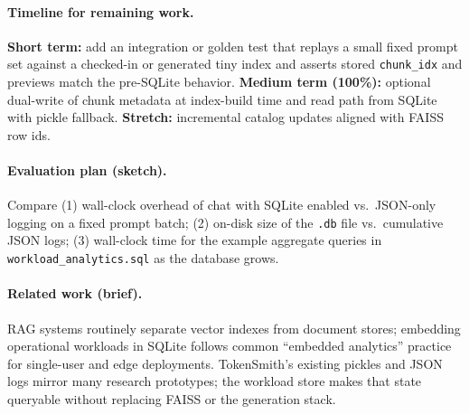 \documentclass[10pt,twocolumn]{article}
\begin{document}
\paragraph{Timeline for remaining work.}
\textbf{Short term:} add an integration or golden test that replays a small fixed prompt set against a checked-in or generated tiny index and asserts stored \texttt{chunk\_idx} and previews match the pre-SQLite behavior. \textbf{Medium term (100\%):} optional dual-write of chunk metadata at index-build time and read path from SQLite with pickle fallback. \textbf{Stretch:} incremental catalog updates aligned with FAISS row ids.

\paragraph{Evaluation plan (sketch).}
Compare (1) wall-clock overhead of chat with SQLite enabled vs.\ JSON-only logging on a fixed prompt batch; (2) on-disk size of the \texttt{.db} file vs.\ cumulative JSON logs; (3) wall-clock time for the example aggregate queries in \texttt{workload\_analytics.sql} as the database grows.

\paragraph{Related work (brief).}
RAG systems routinely separate vector indexes from document stores; embedding operational workloads in SQLite follows common ``embedded analytics'' practice for single-user and edge deployments. TokenSmith's existing pickles and JSON logs mirror many research prototypes; the workload store makes that state queryable without replacing FAISS or the generation stack.
\end{document}
